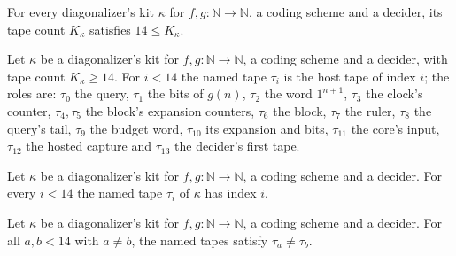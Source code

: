 \begin{theorem}
\label{Turing.NTimeDiag.DzKit.le_K}
\leanok
{}
For every diagonalizer's kit $\kappa$ for $f, g : \mathbb{N} \to \mathbb{N}$, a coding scheme and a
decider, its tape count $K_\kappa$ satisfies $14 \le K_\kappa$.
\end{theorem}

\begin{definition}
\label{Turing.NTimeDiag.DzKit.tp}
\leanok
{}
Let $\kappa$ be a diagonalizer's kit for $f, g : \mathbb{N} \to \mathbb{N}$, a coding scheme and a
decider, with tape count $K_\kappa \ge 14$. For $i < 14$ the named tape $\tau_i$ is the host tape
of index $i$; the roles are: $\tau_0$ the query, $\tau_1$ the bits of $g(n)$, $\tau_2$ the word
$1^{n+1}$, $\tau_3$ the clock's counter, $\tau_4, \tau_5$ the block's expansion counters, $\tau_6$
the block, $\tau_7$ the ruler, $\tau_8$ the query's tail, $\tau_9$ the budget word, $\tau_{10}$ its
expansion and bits, $\tau_{11}$ the core's input, $\tau_{12}$ the hosted capture and $\tau_{13}$
the decider's first tape.
\end{definition}

\begin{theorem}
\label{Turing.NTimeDiag.DzKit.tp_val}
\leanok
{}
Let $\kappa$ be a diagonalizer's kit for $f, g : \mathbb{N} \to \mathbb{N}$, a coding scheme and a
decider. For every $i < 14$ the named tape $\tau_i$ of $\kappa$ has index $i$.
\end{theorem}

\begin{theorem}
\label{Turing.NTimeDiag.DzKit.tp_ne}
\leanok
{}
Let $\kappa$ be a diagonalizer's kit for $f, g : \mathbb{N} \to \mathbb{N}$, a coding scheme and a
decider. For all $a, b < 14$ with $a \ne b$, the named tapes satisfy $\tau_a \ne \tau_b$.
\end{theorem}


